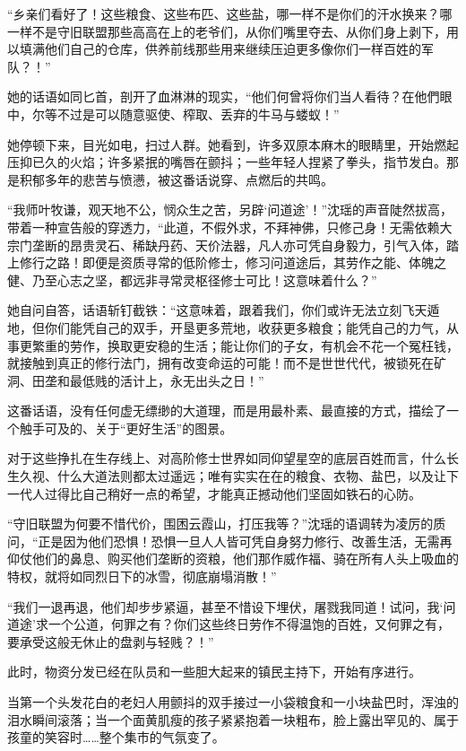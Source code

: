 “乡亲们看好了！这些粮食、这些布匹、这些盐，哪一样不是你们的汗水换来？哪一样不是守旧联盟那些高高在上的老爷们，从你们嘴里夺去、从你们身上剥下，用以填满他们自己的仓库，供养前线那些用来继续压迫更多像你们一样百姓的军队？！”

她的话语如同匕首，剖开了血淋淋的现实，“他们何曾将你们当人看待？在他們眼中，尔等不过是可以随意驱使、榨取、丢弃的牛马与蝼蚁！”

她停顿下来，目光如电，扫过人群。她看到，许多双原本麻木的眼睛里，开始燃起压抑已久的火焰；许多紧抿的嘴唇在颤抖；一些年轻人捏紧了拳头，指节发白。那是积郁多年的悲苦与愤懑，被这番话说穿、点燃后的共鸣。

“我师叶牧谦，观天地不公，悯众生之苦，另辟‘问道途’！”沈瑶的声音陡然拔高，带着一种宣告般的穿透力，“此道，不假外求，不拜神佛，只修己身！无需依赖大宗门垄断的昂贵灵石、稀缺丹药、天价法器，凡人亦可凭自身毅力，引气入体，踏上修行之路！即便是资质寻常的低阶修士，修习问道途后，其劳作之能、体魄之健、乃至心志之坚，都远非寻常灵枢径修士可比！这意味着什么？”

她自问自答，话语斩钉截铁：“这意味着，跟着我们，你们或许无法立刻飞天遁地，但你们能凭自己的双手，开垦更多荒地，收获更多粮食；能凭自己的力气，从事更繁重的劳作，换取更安稳的生活；能让你们的子女，有机会不花一个冤枉钱，就接触到真正的修行法门，拥有改变命运的可能！而不是世世代代，被锁死在矿洞、田垄和最低贱的活计上，永无出头之日！”

这番话语，没有任何虚无缥缈的大道理，而是用最朴素、最直接的方式，描绘了一个触手可及的、关于“更好生活”的图景。

对于这些挣扎在生存线上、对高阶修士世界如同仰望星空的底层百姓而言，什么长生久视、什么大道法则都太过遥远；唯有实实在在的粮食、衣物、盐巴，以及让下一代人过得比自己稍好一点的希望，才能真正撼动他们坚固如铁石的心防。

“守旧联盟为何要不惜代价，围困云霞山，打压我等？”沈瑶的语调转为凌厉的质问，“正是因为他们恐惧！恐惧一旦人人皆可凭自身努力修行、改善生活，无需再仰仗他们的鼻息、购买他们垄断的资粮，他们那作威作福、骑在所有人头上吸血的特权，就将如同烈日下的冰雪，彻底崩塌消散！”

“我们一退再退，他们却步步紧逼，甚至不惜设下埋伏，屠戮我同道！试问，我‘问道途’求一个公道，何罪之有？你们这些终日劳作不得温饱的百姓，又何罪之有，要承受这般无休止的盘剥与轻贱？！”

此时，物资分发已经在队员和一些胆大起来的镇民主持下，开始有序进行。

当第一个头发花白的老妇人用颤抖的双手接过一小袋粮食和一小块盐巴时，浑浊的泪水瞬间滚落；当一个面黄肌瘦的孩子紧紧抱着一块粗布，脸上露出罕见的、属于孩童的笑容时……整个集市的气氛变了。

